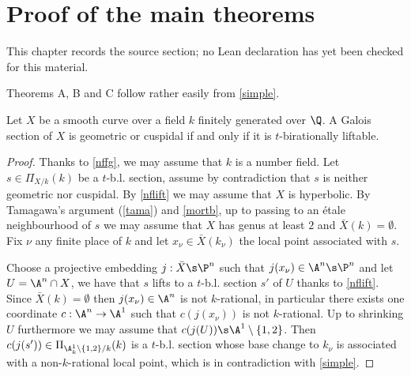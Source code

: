 \chapter{Proof of the main theorems}
\label{birational-section-conjecture-strong-birationality-chapter-07}

\begin{remark}
\label{birational-section-conjecture-strong-birationality-chapter-07-source}
This chapter records the source section; no Lean declaration has yet been checked for this material.
\notready
\end{remark}

Theorems A, B and C follow rather easily from \autoref{simple}.

\begin{TA}
\notready
	Let $X$ be a smooth curve over a field $k$ finitely generated over $\Q$. A Galois section of $X$ is geometric or cuspidal if and only if it is $t$-birationally liftable.
	\begin{proof}
		Thanks to \autoref{nffg}, we may assume that $k$ is a number field. Let $s\in\Pi_{X/k}(k)$ be a $t$-b.l. section, assume by contradiction that $s$ is neither geometric nor cuspidal. By \autoref{nflift} we may assume that $X$ is hyperbolic. By Tamagawa's argument (\autoref{tama}) and \autoref{mortb}, up to passing to an étale neighbourhood of $s$ we may assume that $X$ has genus at least $2$ and $\bar{X}(k)=\emptyset$. Fix $\nu$ any finite place of $k$ and let $x_{\nu}\in \bar{X}(k_{\nu})$ the local point associated with $s$.

		Choose a projective embedding $j:\bar{X}\s\P^{n}$ such that $j(x_{\nu})\in\A^{n}\s\P^{n}$ and let $U=\A^{n}\cap X$, we have that $s$ lifts to a $t$-b.l. section $s'$ of $U$ thanks to \autoref{nflift}. Since $\bar{X}(k)=\emptyset$ then $j(x_{\nu})\in\A^{n}$ is not $k$-rational, in particular there exists one coordinate $c:\A^{n}\to\A^{1}$ such that $c(j(x_{\nu}))$ is not $k$-rational. Up to shrinking $U$ furthermore we may assume that $c(j(U))\s\A^{1}\setminus\{1,2\}$. Then $c(j(s'))\in\Pi_{\A^{1}_{k}\setminus\{1,2\}/k}(k)$ is a $t$-b.l. section whose base change to $k_{\nu}$ is associated with a non-$k$-rational local point, which is in contradiction with \autoref{simple}.
	\end{proof}
\end{TA}

